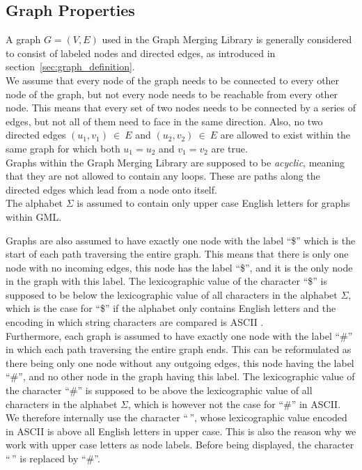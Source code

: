 \documentclass[a4paper,12pt,twoside,BCOR=10mm]{scrbook}
\begin{document}
\subsection{Graph Properties}

A graph $ G = (V, E) $ used in the Graph Merging Library is generally considered to consist of labeled nodes 
and directed edges, as introduced in section~\ref{sec:graph_definition}. \\
We assume that every node of the graph needs to be connected to every other node of the graph, 
but not every node needs to be reachable from every other node. This means that every 
set of two nodes needs to be connected by a series of edges, but not all of them need to face in the same direction. 
Also, no two directed edges $ (u_1, v_1) {\: \in \:} E $ and $ (u_2, v_2) {\: \in \:} E $ are allowed to 
exist within the same graph for which both $ u_1 = u_2 $ and $ v_1 = v_2 $ are true. \\
Graphs within the Graph Merging Library are supposed to be \textit{acyclic}, 
meaning that they are not allowed to contain any loops. These are paths along 
the directed edges which lead from a node onto itself. \\
The alphabet $ \Sigma $ is assumed to contain only upper case English letters for graphs within GML.

Graphs are also assumed to have exactly one node with the label “\$” which 
is the start of each path traversing the entire graph. This means that there is only one node with no incoming 
edges, this node has the label “\$”, and it is the only node in the graph with this label. 
The lexicographic value of the character “\$” is supposed to be below the 
lexicographic value of all characters in the alphabet $ \Sigma $, 
which is the case for “\$” if the alphabet only contains English letters and the encoding in 
which string characters are compared is ASCII \citep{ASCII}. \\
Furthermore, each graph is assumed to have exactly one node with the label “\#” in which 
each path traversing the entire graph ends. This can be reformulated as there being only one node without any 
outgoing edges, this node having the label “\#”, and no other node in the graph having this label. 
The lexicographic value of the character “\#” is supposed to be above the 
lexicographic value of all characters in the alphabet $ \Sigma $, 
which is however not the case for “\#” in ASCII. 
We therefore internally use the character “$^{\,}$”, whose lexicographic value encoded in ASCII 
is above all English letters in upper case. 
This is also the reason why we work with upper case letters as node labels. 
Before being displayed, the character “$^{\,}$” is replaced by “\#”.
\end{document}

